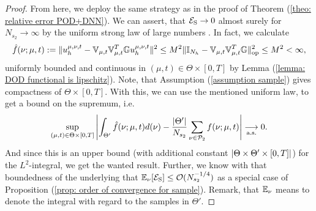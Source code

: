 \begin{proof}
    From here, we deploy the same strategy as in the proof of Theorem (\ref{theo: relative error POD+DNN}). We
    can assert, that $\mathcal{E}_\text{S} \to 0$ almost surely for $N_{s_2} \to \infty$ by 
    the uniform strong law of large numbers \cite{newey1994}.
    In fact, we calculate
    \begin{equation*}
        \hat f(\nu; \mu, t) := \lVert u_h^{\mu, \nu, t} - \mathbb{V}_{\mu, t} \mathbb{V}_{\mu, t}^T \mathbb{G} u_h^{\mu, \nu, t} \rVert^2 
        \leq M^2 \lVert \mathbb{I}_{N_h} - \mathbb{V}_{\mu, t}\mathbb{V}_{\mu,t}^T \mathbb{G} \rVert_\text{op}^2
        \leq M^2 < \infty,
    \end{equation*}
    uniformly bounded and continuous 
    in $(\mu, t) \in \Theta \times [0, T]$ by Lemma (\ref{lemma: DOD functional is lipschitz}).
    Note, that Assumption (\ref{assumption sample}) gives compactness of $\Theta \times [0, T]$.
    With this, we can use the mentioned uniform law, to get a bound on the supremum, i.e.
    \begin{equation*}
        \sup\limits_{(\mu, t) \in \Theta \times [0, T]} \left\vert
            \int_{\Theta'} \hat f(\nu; \mu, t) d(\nu) - 
            \frac{\lvert \Theta' \rvert}{N_{s_2}} \sum_{\nu \in \mathcal{P}_2} f(\nu; \mu, t)
        \right\vert \underset{\text{a.s.}}{\longrightarrow} 0.
    \end{equation*}
    And since this is an upper bound (with additional constant $\lvert \Theta \times \Theta' \times [0, T] \rvert$) 
    for the $L^2$-integral, we get the wanted result.
    Further, we know with that boundedness of the underlying
    that $\mathbb{E}_\nu[\mathcal{E}_\text{S}] \leq \mathcal{O}(N_{s_2}^{-1/4})$ as a special case of
    Proposition (\ref{prop: order of convergence for sample}). Remark, that $\mathbb{E}_\nu$
    means to denote the integral with regard to the samples in $\Theta'$.


\end{proof}
